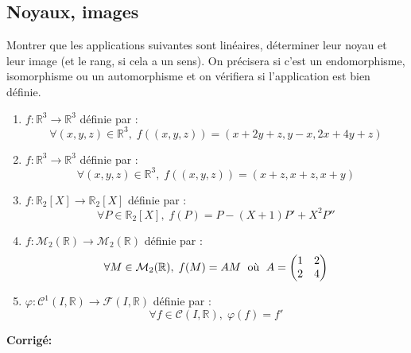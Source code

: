 \documentclass[a4paper,twoside,french,11pt]{VcCours}
\newcommand{\corr}{\textbf{Corrigé:}}
\begin{document}

\tableofcontents
\separationTitre

\subsection{\large Noyaux, images}


\begin{Exercice}{} Montrer que les applications suivantes sont linéaires, déterminer leur noyau et leur image (et le rang, si cela a un sens). On précisera si c'est un endomorphisme, isomorphisme ou un automorphisme et on vérifiera si l'application est bien définie.

\begin{enumerate}
\item $f : \mathbb{R}^3 \rightarrow \mathbb{R}^3$ définie par :
$$ \forall (x,y,z) \in \mathbb{R}^3, \; f((x,y,z))= (x+2y+z,y-x,2x+4y+z)$$
\item $f : \mathbb{R}^3 \rightarrow \mathbb{R}^3$ définie par :
$$ \forall (x,y,z) \in \mathbb{R}^3, \; f((x,y,z))= (x+z,x+z,x+y)$$
\item $f : \mathbb{R}_2[X] \rightarrow \mathbb{R}_2[X]$ définie par :
$$ \forall P \in \mathbb{R}_2[X], \; f(P)=P-(X+1)P'+X^2 P''$$
\item $f : \mathcal{M}_2(\mathbb{R}) \rightarrow \mathcal{M}_2(\mathbb{R})$ définie par :
$$ \forall M \in \mathcal{M}_2(\mathbb{R}), \; f(M)=AM \; \hbox{ où } \; A= \begin{pmatrix}
1 & 2 \\
2 & 4 \\
\end{pmatrix} $$
\item $\varphi : \mathcal{C}^1(I, \mathbb{R}) \rightarrow \mathcal{F}(I, \mathbb{R})$ définie par :
$$ \forall f \in \mathcal{C}(I, \mathbb{R}), \; \varphi(f)=f'$$
\end{enumerate}
\end{Exercice}

\corr 
\end{document}
